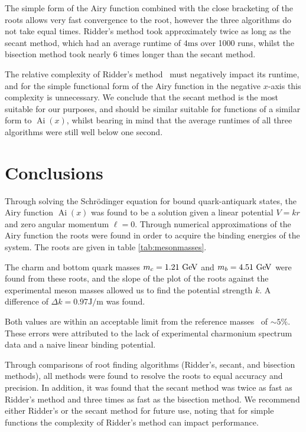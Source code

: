 \documentclass[]{article}
\newcommand{\Ai}[1]{\ensuremath{\operatorname{Ai}({#1})}}
\begin{document}
The simple form of the Airy function combined with the close bracketing of the roots allows very fast convergence to the root, however the three algorithms do not take equal times. Ridder's method took approximately twice as long as the secant method, which had an average runtime of $4\si{\milli\second}$ over 1000 runs, whilst the bisection method took nearly 6 times longer than the secant method.

The relative complexity of Ridder's method~\cite{ref:nr} must negatively impact its runtime, and for the simple functional form of the Airy function in the negative $x$-axis this complexity is unnecessary. We conclude that the secant method is the most suitable for our purposes, and should be similar suitable for functions of a similar form to \Ai{x}, whilst bearing in mind that the average runtimes of all three algorithms were still well below one second.

\section{Conclusions}\label{sec:conclusion}

Through solving the Schr\"{o}dinger equation for bound quark-antiquark states, the Airy function \Ai{x} was found to be a solution given a linear potential $V = kr$ and zero angular momentum $\ell = 0$. Through numerical approximations of the Airy function the roots were found in order to acquire the binding energies of the \qqbar system. The roots are given in table \ref{tab:mesonmasses}.

The charm and bottom quark masses $m_{c} = 1.21\GeV$ and $m_{b} = 4.51\GeV$ were found from these roots, and the slope of the plot of the roots against the experimental meson masses allowed us to find the potential strength $k$. A difference of $\Delta k = 0.97 \si{\joule\per\metre}$ was found.

Both values are within an acceptable limit from the reference masses~\cite{ref:pdg} of $\sim 5\%$. These errors were attributed to the lack of experimental charmonium spectrum data and a naive linear binding potential. 

Through comparisons of root finding algorithms (Ridder's, secant, and bisection methods), all methods were found to resolve the roots to equal accuracy and precision. In addition, it was found that the secant method was twice as fast as Ridder's method and three times as fast as the bisection method. We recommend either Ridder's or the secant method for future use, noting that for simple functions the complexity of Ridder's method can impact performance.
\end{document}
